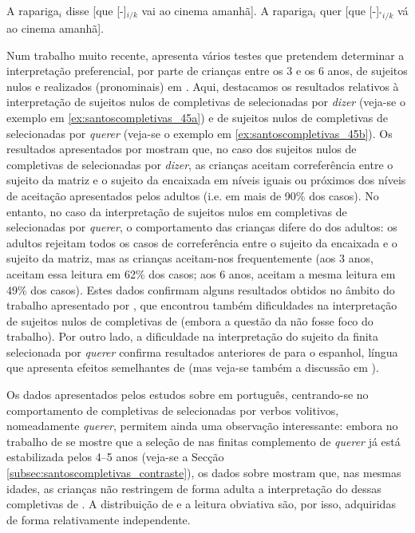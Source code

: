\documentclass[output=paper]{LSP/langsci}
\begin{document}
\ea\label{ex:santoscompletivas_45}
\ea\label{ex:santoscompletivas_45a} A rapariga$_i$ disse [que [-]$_{i/k}$ vai ao cinema amanhã].
\ex\label{ex:santoscompletivas_45b} A rapariga$_i$ quer [que [-]$_{^{*}i/k}$ vá ao cinema amanhã].
\zl

Num trabalho muito recente, \citet{silva2015} apresenta vários testes que pretendem determinar a interpretação preferencial, por parte de crianças entre os 3 e os 6 anos, de sujeitos nulos e realizados (pronominais) em . Aqui, destacamos os resultados relativos à interpretação de sujeitos nulos de completivas de  selecionadas por \textit{dizer} (veja-se o exemplo em \ref{ex:santoscompletivas_45a}) e de sujeitos nulos de completivas de  selecionadas por \textit{querer} (veja-se o exemplo em \ref{ex:santoscompletivas_45b}). Os resultados apresentados por \citet{silva2015} mostram que, no caso dos sujeitos nulos de completivas de  selecionadas por \textit{dizer}, as crianças aceitam correferência entre o sujeito da matriz e o sujeito da encaixada em níveis iguais ou próximos dos níveis de aceitação apresentados pelos adultos (i.e. em mais de 90\% dos casos). No entanto, no caso da interpretação de sujeitos nulos em completivas de  selecionadas por \textit{querer}, o comportamento das crianças difere do dos adultos: os adultos rejeitam todos os casos de correferência entre o sujeito da encaixada e o sujeito da matriz, mas as crianças aceitam-nos frequentemente (aos 3 anos, aceitam essa leitura em 62\% dos casos; aos 6 anos, aceitam a mesma leitura em 49\% dos casos). Estes dados confirmam alguns resultados obtidos no âmbito do trabalho apresentado por \citet{ambulate2008}, que encontrou também dificuldades na interpretação de sujeitos nulos de completivas de  (embora a questão da  não fosse foco do trabalho). Por outro lado, a dificuldade na interpretação do sujeito da finita selecionada por \textit{querer} confirma resultados anteriores de \citet{padilla1990} para o espanhol, língua que apresenta efeitos semelhantes de  (mas veja-se também a discussão em \citealt{avrutinwexler2000}).

Os dados apresentados pelos estudos sobre  em português, centrando\x-se no comportamento de completivas de  selecionadas por verbos volitivos, nomeadamente \textit{querer}, permitem ainda uma observação interessante: embora no trabalho de \citet{jesus2014} se mostre que a seleção de  nas finitas complemento de \textit{querer} já está estabilizada pelos 4--5 anos (veja-se a Secção \ref{subsec:santoscompletivas_contraste}), os dados sobre  mostram que, nas mesmas idades, as crianças não restringem de forma adulta a interpretação do  dessas completivas de . A distribuição de  e a leitura obviativa são, por isso, adquiridas de forma relativamente independente.
\end{document}
